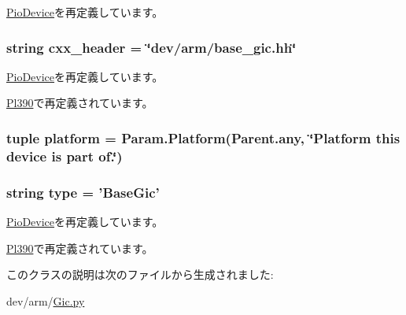 \hyperlink{classDevice_1_1PioDevice_a17fa61ac3806b481cafee5593b55e5d0}{PioDevice}を再定義しています。\hypertarget{classGic_1_1BaseGic_a17da7064bc5c518791f0c891eff05fda}{
\subsubsection[{cxx\_\-header}]{\setlength{\rightskip}{0pt plus 5cm}string {\bf cxx\_\-header} = \char`\"{}dev/arm/base\_\-gic.hh\char`\"{}}}
\label{classGic_1_1BaseGic_a17da7064bc5c518791f0c891eff05fda}


\hyperlink{classDevice_1_1PioDevice_a17da7064bc5c518791f0c891eff05fda}{PioDevice}を再定義しています。

\hyperlink{classGic_1_1Pl390_a17da7064bc5c518791f0c891eff05fda}{Pl390}で再定義されています。\hypertarget{classGic_1_1BaseGic_ae6d09ca44893db6cdb66d62deaa1aefd}{
\subsubsection[{platform}]{\setlength{\rightskip}{0pt plus 5cm}tuple {\bf platform} = Param.Platform(Parent.any, \char`\"{}Platform this device is part of.\char`\"{})}}
\label{classGic_1_1BaseGic_ae6d09ca44893db6cdb66d62deaa1aefd}
\hypertarget{classGic_1_1BaseGic_acce15679d830831b0bbe8ebc2a60b2ca}{
\subsubsection[{type}]{\setlength{\rightskip}{0pt plus 5cm}string {\bf type} = '{\bf BaseGic}'}}
\label{classGic_1_1BaseGic_acce15679d830831b0bbe8ebc2a60b2ca}


\hyperlink{classDevice_1_1PioDevice_acce15679d830831b0bbe8ebc2a60b2ca}{PioDevice}を再定義しています。

\hyperlink{classGic_1_1Pl390_acce15679d830831b0bbe8ebc2a60b2ca}{Pl390}で再定義されています。

このクラスの説明は次のファイルから生成されました:\begin{DoxyCompactItemize}
\item 
dev/arm/\hyperlink{Gic_8py}{Gic.py}\end{DoxyCompactItemize}
